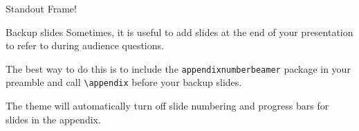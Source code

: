 \begin{frame}
				Standout Frame!
\end{frame}

\appendix
\begin{frame}[fragile]{Backup slides}
				Sometimes, it is useful to add slides at the end of your presentation to
				refer to during audience questions.

				The best way to do this is to include the \verb|appendixnumberbeamer|
				package in your preamble and call \verb|\appendix| before your
				backup slides.

				The theme will automatically turn off slide numbering and progress bars for
				slides in the appendix.
\end{frame}
